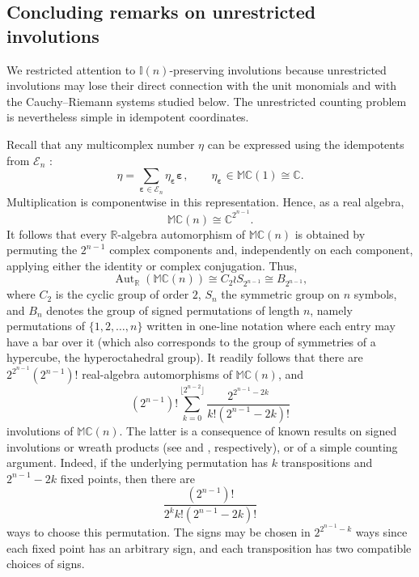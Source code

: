 \documentclass[12pt]{amsart}
\theoremstyle{plain}
\theoremstyle{definition}
\numberwithin{equation}{section}
\newcommand{\bep}[1]{\bm{\varepsilon_{#1}}}
\newcommand{\mC}{\mathbb{C}}
\newcommand{\mM}{\mathbb{M}}
\newcommand{\mI}{\mathbb{I}}
\begin{document}
\subsection{Concluding remarks on unrestricted involutions}\label{Ss:GeneralCase}

We restricted attention to $\mI(n)$-preserving involutions because unrestricted involutions may lose their direct connection with the unit monomials and with the Cauchy--Riemann systems studied below. The unrestricted counting problem is nevertheless simple in idempotent coordinates.

Recall that any multicomplex number $\eta$ can be expressed using the idempotents from $\mathcal{E}_n$ : 
\[
\eta=\sum_{\bep{} \in \mathcal{E}_n} \eta_{\bep{}} \bep{},
\qquad \eta_{\bep{}} \in\mM \mC(1)\cong\mC .
\]
Multiplication is componentwise in this representation. Hence, as a real algebra, 
$$
\mM\mC(n) \cong \mathbb C^{2^{n-1}}.
$$
It follows that every $\mathbb R$-algebra automorphism of $\mM\mC(n)$ is obtained by permuting the $2^{n-1}$ complex components and, independently on each component, applying either the identity or complex conjugation. Thus, 
$$
\operatorname{Aut}_{\mathbb R}(\mM\mC(n)) \cong C_2 \wr S_{2^{n-1}} \cong B_{2^{n-1}},
$$
where $C_2$ is the cyclic group of order $2$, $S_n$ the symmetric group on $n$ symbols, and $B_n$ denotes the group of signed permutations of length $n$, namely permutations of $\{1, 2,\ldots,n\}$ written in one-line notation where each entry may have a bar over it (which also corresponds to the group of symmetries of a hypercube, the hyperoctahedral group). It readily follows that there are
$2^{2^{n-1}}(2^{n-1})!$ real-algebra automorphisms of $\mM\mC(n)$, and 
$$
(2^{n-1})!\sum_{k = 0}^{\lfloor 2^{n-2}\rfloor} \frac{2^{2^{n-1}-2k}}{k! (2^{n-1} - 2k)!}
$$
involutions of $\mM\mC(n)$.
The latter is a consequence of known results on signed involutions or wreath products (see \cite{countinginvo} and \cite{countingwr}, respectively), or of a simple counting argument. Indeed, if the underlying permutation has $k$ transpositions and $2^{n-1}-2k$ fixed points, then there are $$\frac{(2^{n-1})!}{2^k k!(2^{n-1}-2k)!}$$ ways to choose this permutation. The signs may be chosen in $2^{2^{n-1}-k}$ ways since each fixed point has an arbitrary sign, and each transposition has two compatible choices of signs.
\end{document}
